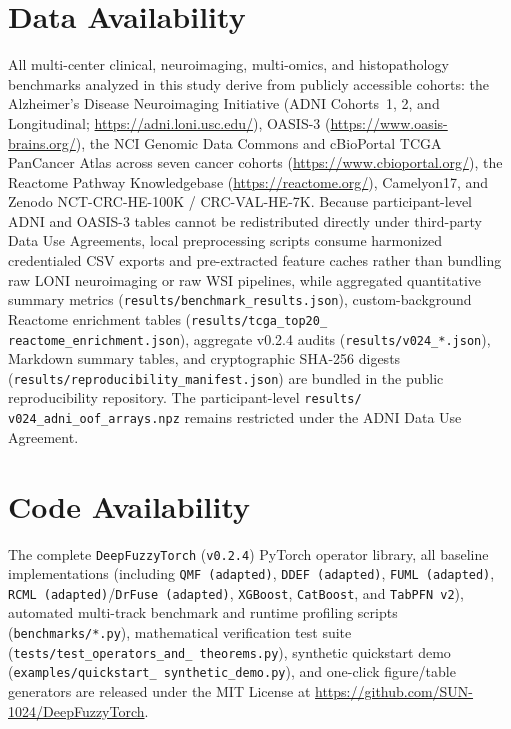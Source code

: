 \documentclass[10pt,twocolumn]{article}
\begin{document}
\FloatBarrier
\section*{Data Availability}
All multi-center clinical, neuroimaging, multi-omics, and histopathology benchmarks analyzed in
this study derive from publicly accessible cohorts: the Alzheimer's Disease Neuroimaging
Initiative (ADNI Cohorts~1, 2, and Longitudinal; \url{https://adni.loni.usc.edu/}), OASIS-3
(\url{https://www.oasis-brains.org/}), the NCI Genomic Data Commons and cBioPortal TCGA
PanCancer Atlas across seven cancer cohorts (\url{https://www.cbioportal.org/}), the Reactome
Pathway Knowledgebase (\url{https://reactome.org/}), Camelyon17, and Zenodo NCT-CRC-HE-100K /
CRC-VAL-HE-7K. Because participant-level ADNI and OASIS-3 tables cannot be redistributed
directly under third-party Data Use Agreements, local preprocessing scripts consume harmonized
credentialed CSV exports and pre-extracted feature caches rather than bundling raw LONI
neuroimaging or raw WSI pipelines, while aggregated quantitative summary metrics
(\texttt{results/\allowbreak benchmark\_\allowbreak results.json}), custom-background Reactome
enrichment tables (\texttt{results/\allowbreak tcga\_\allowbreak top20\_\allowbreak
reactome\_\allowbreak enrichment.json}), aggregate v0.2.4 audits
(\texttt{results/v024\_*.json}), Markdown summary tables, and cryptographic SHA-256 digests
(\texttt{results/\allowbreak reproducibility\_\allowbreak manifest.json}) are bundled in the
public reproducibility repository. The participant-level \texttt{results/\allowbreak
v024\_adni\_oof\_arrays.npz} remains restricted under the ADNI Data Use Agreement.

\section*{Code Availability}
The complete \texttt{DeepFuzzyTorch} (\texttt{v0.2.4}) PyTorch operator library, all baseline
implementations (including \texttt{QMF (adapted)}, \texttt{DDEF (adapted)}, \texttt{FUML
(adapted)}, \texttt{RCML (adapted)}/\texttt{DrFuse (adapted)}, \texttt{XGBoost},
\texttt{CatBoost}, and \texttt{TabPFN~v2}), automated multi-track benchmark and runtime
profiling scripts (\texttt{benchmarks/*.py}), mathematical verification test suite
(\texttt{tests/\allowbreak test\_\allowbreak operators\_\allowbreak and\_\allowbreak
theorems.py}), synthetic quickstart demo (\texttt{examples/\allowbreak quickstart\_\allowbreak
synthetic\_\allowbreak demo.py}), and one-click figure/table generators are released under the
MIT License at \url{https://github.com/SUN-1024/DeepFuzzyTorch}.
\end{document}
